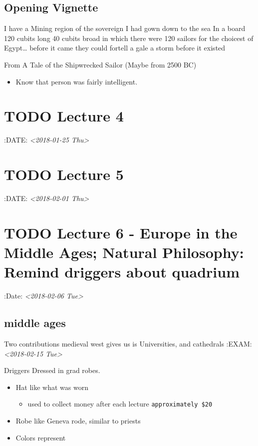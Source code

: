 \documentclass[11pt]{article}
\begin{document}
\subsection{Opening Vignette}
\label{sec-4-1}
I have a Mining region of the sovereign
I had gown down to the sea
In a board 120 cubits long
40 cubits broad
in which there were 120 sailors for the choicest of Egypt\ldots{}
before it came they could fortell a gale
a storm before it existed

From A Tale of the Shipwrecked Sailor (Maybe from 2500 BC)

\begin{itemize}
\item Know that person was fairly intelligent.
\end{itemize}

\section{{\bfseries\sffamily TODO} Lecture 4}
\label{sec-5}
:DATE: \textit{<2018-01-25 Thu>}

\section{{\bfseries\sffamily TODO} Lecture 5}
\label{sec-6}
:DATE: \textit{<2018-02-01 Thu>}

\section{{\bfseries\sffamily TODO} Lecture 6 - Europe in the Middle Ages; Natural Philosophy: Remind driggers about quadrium}
\label{sec-7}
:Date: \textit{<2018-02-06 Tue>}

\subsection{middle ages}
\label{sec-7-1}
Two contributions medieval west gives us is Universities, and cathedrals
:EXAM: \textit{<2018-02-15 Tue>}

Driggers Dressed in grad robes.\\
\begin{itemize}
\item Hat like what was worn
\begin{itemize}
\item used to collect money after each lecture \texttt{approximately \$20}
\end{itemize}

\item Robe like Geneva rode, similar to priests
\item Colors represent
\end{itemize}
\end{document}
